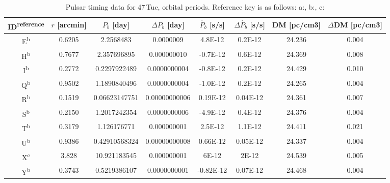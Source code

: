 \begin{table}
	\centering
	\caption{Pulsar timing data for 47\,Tuc, orbital periods. Reference key is as follows:
		a:\citet{Freire2018}, b:\citet{Freire2017}, c:\citet{Ridolfi2016}}

	\begin{tabular}{c c c c c c c c}
		\hline

		ID\textsuperscript{reference} & $r$ [arcmin] & $P_b$ [day]   & $\Delta P_b$ [day] & $\dot{P_b}$ [s/s] & $\Delta \dot{P_b}$ [s/s] & DM [pc/cm3] & $\Delta$DM [pc/cm3] \\

		\hline
		E\textsuperscript{b}          & 0.6205       & 2.2568483     & 0.0000009          & \num{4.8E-12}     & \num{0.2E-12}            & 24.236      & 0.004               \\
		H\textsuperscript{b}          & 0.7677       & 2.357696895   & 0.000000010        & \num{-0.7E-12}    & \num{0.6E-12}            & 24.369      & 0.008               \\
		I\textsuperscript{b}          & 0.2772       & 0.2297922489  & 0.0000000004       & \num{-0.8E-12}    & \num{0.2E-12}            & 24.429      & 0.010               \\
		Q\textsuperscript{b}          & 0.9502       & 1.1890840496  & 0.0000000004       & \num{-1.0E-12}    & \num{0.2E-12}            & 24.265      & 0.004               \\
		R\textsuperscript{b}          & 0.1519       & 0.06623147751 & 0.00000000006      & \num{0.19E-12}    & \num{0.04E-12}           & 24.361      & 0.007               \\
		S\textsuperscript{b}          & 0.2150       & 1.2017242354  & 0.0000000006       & \num{-4.9E-12}    & \num{0.4E-12}            & 24.376      & 0.004               \\
		T\textsuperscript{b}          & 0.3179       & 1.126176771   & 0.000000001        & \num{2.5E-12}     & \num{1.1E-12}            & 24.411      & 0.021               \\
		U\textsuperscript{b}          & 0.9386       & 0.42910568324 & 0.00000000008      & \num{0.66E-12}    & \num{0.05E-12}           & 24.337      & 0.004               \\
		X\textsuperscript{c}          & 3.828        & 10.921183545  & 0.000000001        & \num{6E-12}       & \num{2E-12}              & 24.539      & 0.005               \\
		Y\textsuperscript{b}          & 0.3743       & 0.5219386107  & 0.0000000001       & \num{-0.82E-12}   & \num{0.07E-12}           & 24.468      & 0.004               \\
		\hline
	\end{tabular}

	\label{tab:pulsars_orbital}

\end{table}




